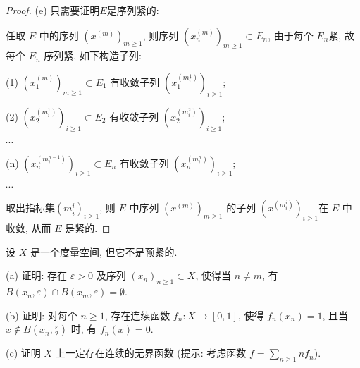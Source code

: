 \documentclass{mathexercise}
\begin{document}
\begin{proof}
    (e) 只需要证明$E$是序列紧的:
    
    任取 $E$ 中的序列 $(x^{(m)})_{m\geq 1}$,
    则序列 $(x_n^{(m)})_{m\geq 1}\subset E_n$, 由于每个 $E_n $紧, 故每个 $E_n$ 序列紧, 如下构造子列:
    
    (1) $(x_1^{(m)})_{m\geq 1}\subset E_1$ 有收敛子列 $(x_1^{(m_i^1)})_{i\geq 1}$;
    
    (2) $(x_2^{(m_i^1)})_{i\geq 1}\subset E_2$ 有收敛子列 $(x_2^{(m_i^2)})_{i\geq 1}$;
    
    $\cdots$
    
    (n) $(x_n^{(m_i^{n-1})})_{i\geq 1}\subset E_n$ 有收敛子列 $(x_n^{(m_i^n)})_{i\geq 1}$;
    
    $\cdots$
    
    取出指标集$(m_i^i)_{i\geq 1}$, 则 $E$ 中序列 $(x^{(m)})_{m\geq 1}$ 的子列 $(x^{(m_i^i)})_{i\geq 1}$在 $E$ 中收敛,
    从而 $E$ 是紧的.
\end{proof}



\begin{exercise}
    设 $X$ 是一个度量空间, 但它不是预紧的.

    (a) 证明: 存在 $\varepsilon>0$ 及序列 $\left(x_{n}\right)_{n\geq 1}\subset X$, 使得当 $n \neq m$, 
    有 $B\left(x_{n},\varepsilon\right)\cap B\left(x_{m},\varepsilon\right)=\emptyset$.

    (b) 证明: 对每个 $n\geq 1$, 存在连续函数 $f_{n}: X \rightarrow[0,1]$, 
    使得 $f_{n}\left(x_{n}\right)=1$, 且当 $x\notin B\left(x_{n},\frac{\varepsilon}{2}\right)$ 时, 有 $f_{n}(x)=0$.

    (c) 证明 $X$ 上一定存在连续的无界函数 (提示: 考虑函数 $f=\sum_{n\geq 1} n f_{n}$).
\end{exercise}
\end{document}

